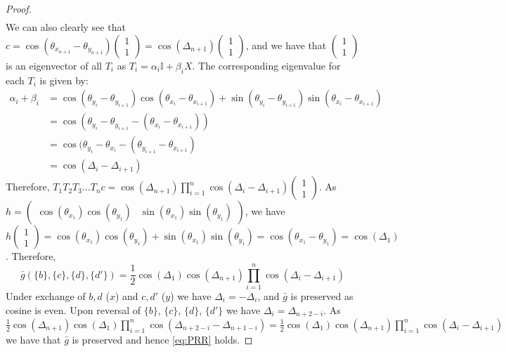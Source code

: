 \documentclass[aps,floatfix,10pt,amssymb,amsfont,amsmath,superscriptaddress,float,nofootinbib,longbibliography,nobalancelastpage,twocolumn]{revtex4-2}
\begin{document}
\begin{widetext}
\begin{proof}
\begin{align}
\end{align}
We can also clearly see that $c = \cos (\theta_{x_{n+1}} -\theta_{y_{n+1}}) \begin{pmatrix}
    1\\1
\end{pmatrix} =  \cos(\Delta_{n+1})\begin{pmatrix}
    1\\1
\end{pmatrix} $, and we have that $\begin{pmatrix}
    1\\1
\end{pmatrix}$ is an eigenvector of all $T_i$ as $T_i = \alpha_i \mathbb{I} + \beta_i X$. The corresponding eigenvalue for each $T_i$ is given by:
\begin{align}
    \alpha_i+\beta_i&=\cos (\theta_{y_i} - \theta_{y_{i+1}})\cos (\theta_{x_{i}} - \theta_{x_{i+1}}) + \sin (\theta_{y_i} - \theta_{y_{i+1}})\sin (\theta_{x_{i}} - \theta_{x_{i+1}}) \\
    &= \cos(\theta_{y_i} - \theta_{y_{i+1}} - (\theta_{x_{i}} - \theta_{x_{i+1}}))\\
    &= \cos(\theta_{y_i} - \theta_{x_{i}} - (\theta_{y_{i+1}} - \theta_{x_{i+1}})\\
    &= \cos(\Delta_i - \Delta_{i+1})
\end{align}
Therefore, $T_1T_2T_3\ldots T_nc = \cos(\Delta_{n+1})\prod_{i=1}^{n}\cos(\Delta_i - \Delta_{i+1})\begin{pmatrix}
    1\\1
\end{pmatrix}$. As $h = \begin{pmatrix}
    \cos(\theta_{x_1})\cos(\theta_{y_1})& \sin(\theta_{x_1})\sin(\theta_{y_1})
\end{pmatrix}$, we have $h\begin{pmatrix}
    1\\1
\end{pmatrix}= \cos(\theta_{x_1})\cos(\theta_{y_1}) + \sin(\theta_{x_1})\sin(\theta_{y_1}) = \cos(\theta_{x_1}-\theta_{y_1}) = \cos(\Delta_1)$. Therefore,
\begin{equation}
    \bar g(\{b\},\{c\},\{d\},\{d'\}) =\frac{1}{2}\cos(\Delta_1)\cos(\Delta_{n+1})\prod_{i=1}^{n}\cos(\Delta_i - \Delta_{i+1})
\end{equation}
  Under exchange of $b,d$ ($x$) and $c,d'$ ($y$) we have $\Delta_i = -\Delta_i$, and $\bar g$ is preserved as cosine is even. Upon reversal of $\{b\}$, $\{c\}$, $\{d\}$, $\{d'\}$ we have $\Delta_i = \Delta_{n+2-i}$. As $\frac{1}{2}\cos(\Delta_{n+1})\cos(\Delta_{1})\prod_{i=1}^{n}\cos(\Delta_{n+2-i} - \Delta_{n+1-i}) = \frac{1}{2}\cos(\Delta_1)\cos(\Delta_{n+1})\prod_{i=1}^{n}\cos(\Delta_i - \Delta_{i+1})$ we have that $\bar g$ is preserved and hence \eqref{eq:PRR} holds.

\end{proof}
\end{widetext}
\end{document}
